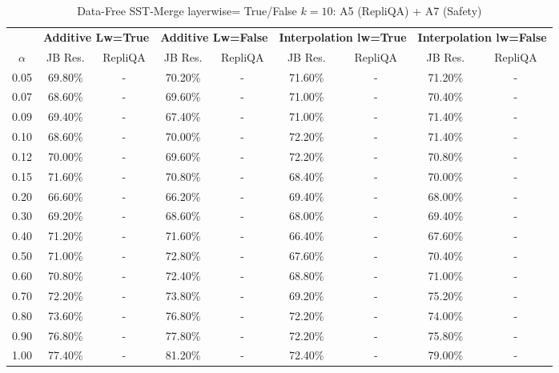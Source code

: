 \begin{table}[h]
\centering
\caption{Data-Free SST-Merge layerwise= True/False $k=10$: A5 (RepliQA) + A7 (Safety)}
\label{tab:res_a5_a7_data_free_sst_10}
\begin{tabular}{c|cc|cc|cc|cc}
\hline
 & \multicolumn{2}{c|}{\textbf{Additive Lw=True}} & \multicolumn{2}{c|}{\textbf{Additive Lw=False}} & \multicolumn{2}{c|}{\textbf{Interpolation lw=True}}& \multicolumn{2}{c}{\textbf{Interpolation lw=False}} \\
$\alpha$ & JB Res. & RepliQA & JB Res. & RepliQA & JB Res. & RepliQA & JB Res. & RepliQA \\
\hline
0.05 & 69.80\% & - & 70.20\% & - & 71.60\% & - & 71.20\% & - \\
0.07 & 68.60\% & - & 69.60\% & - & 71.00\% & - & 70.40\% & - \\
0.09 & 69.40\% & - & 67.40\% & - & 71.00\% & - & 71.40\% & - \\
0.10 & 68.60\% & - & 70.00\% & - & 72.20\% & - & 71.40\% & - \\
0.12 & 70.00\% & - & 69.60\% & - & 72.20\% & - & 70.80\% & - \\
0.15 & 71.60\% & - & 70.80\% & - & 68.40\% & - & 70.00\% & - \\
0.20 & 66.60\% & - & 66.20\% & - & 69.40\% & - & 68.00\% & - \\
0.30 & 69.20\% & - & 68.60\% & - & 68.00\% & - & 69.40\% & - \\
0.40 & 71.20\% & - & 71.60\% & - & 66.40\% & - & 67.60\% & - \\
0.50 & 71.00\% & - & 72.80\% & - & 67.60\% & - & 70.40\% & - \\
0.60 & 70.80\% & - & 72.40\% & - & 68.80\% & - & 71.00\% & - \\
0.70 & 72.20\% & - & 73.80\% & - & 69.20\% & - & 75.20\% & - \\
0.80 & 73.60\% & - & 76.80\% & - & 72.20\% & - & 74.00\% & - \\
0.90 & 76.80\% & - & 77.80\% & - & 72.20\% & - & 75.80\% & - \\
1.00 & 77.40\% & - & 81.20\% & - & 72.40\% & - & 79.00\% & - \\
\hline
\end{tabular}
\end{table}
\FloatBarrier

